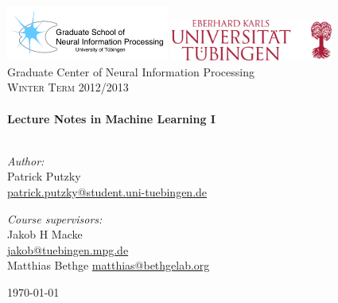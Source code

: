\begin{titlepage}

\begin{center}


\includegraphics[width=0.4\textwidth]{./titlepage/logo_gtc.png} \bigskip 
\includegraphics[width=0.4\textwidth]{./titlepage/logo_uni.png}\\[1cm]    

\LARGE Graduate Center of Neural Information Processing\\[1.5cm]


\textsc{\Large Winter Term 2012/2013}\\[0.3cm]
\HRule \\[0.5cm]
{ \huge \bfseries Lecture Notes in Machine Learning I}\\[0.4cm]

\HRule \\[1.5cm]

\begin{minipage}{0.45\textwidth}
\begin{flushleft} \large
\emph{Author:}\\
 Patrick Putzky \\
 \href{mailto:patrick.putzky@student.uni-tuebingen.de}{patrick.putzky@student.uni-tuebingen.de} \\
\end{flushleft}
\end{minipage}
\begin{minipage}{0.45\textwidth}
\begin{flushright} \large
\emph{Course supervisors:} \\
 Jakob H Macke \\
 \href{mailto:jakob@tuebingen.mpg.de}{jakob@tuebingen.mpg.de} \\
 Matthias Bethge
 \href{mailto:matthias@bethgelab.org}{matthias@bethgelab.org} \\

\end{flushright}
\end{minipage}

\vfill

{\large \today}

\end{center}

\end{titlepage}